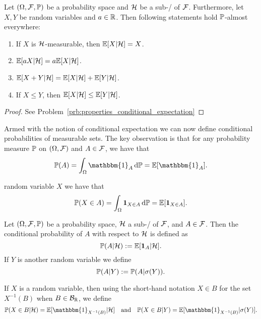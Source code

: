 \begin{lemma}\label{lem:properties_conditional_expectation}
Let $(\Omega, \mathcal F, \mathbb P)$ be a probability space and $\mathcal H$ be a sub-\sigalg/ of $\mathcal F$. Furthermore, let $X, Y$ be random variables and $a \in \mathbb R$. Then following statements hold $\mathbb P$-almost everywhere:
\begin{enumerate}[label={(\alph*)}]
\item If $X$ is $\mathcal H$-measurable, then $\mathbb E[X | \mathcal H] = X$.
\item $\mathbb E[a X | \mathcal H] = a \mathbb E[X | \mathcal H]$.
\item $\mathbb E[X + Y | \mathcal H] = \mathbb E[X | \mathcal H] + \mathbb E[Y | \mathcal H]$.
\item If $X \le Y$, then $\mathbb E[X | \mathcal H] \le \mathbb E[Y | \mathcal H]$.
\end{enumerate}
\end{lemma}

\begin{proof}
See Problem~\ref{prb:properties_conditional_expectation}
\end{proof}


Armed with the notion of conditional expectation we can now define conditional probabilities of measurable sets. The key observation is that for any probability measure $\mathbb P$ on $(\Omega, \mathcal F)$ and $A \in \mathcal F$, we have that
\[
	\bbP(A) = \int_\Omega \mathbbm{1}_{A} \, \dd \bbP = \bbE[\mathbbm{1}_A].
\]

random variable $X$ we have that
\[
	\mathbb P(X \in A) = \int_\Omega \mathbf{1}_{X \in A} \, \mathrm{d} \mathbb P = \mathbb E[\mathbf{1}_{X \in A}].
\]

\begin{definition}
Let $(\Omega, \mathcal F, \mathbb P)$ be a probability space, $\mathcal H$ a sub-\sigalg/ of $\mathcal F$, and $A \in \mathcal F$. Then the conditional probability of $A$ with respect to $\mathcal H$ is defined as
\[
	\mathbb P(A | \mathcal H) := \mathbb E[\mathbf{1}_{A} | \mathcal H].
\]
If $Y$ is another random variable we define
\[
	\mathbb P(A | Y) := \mathbb P( A | \sigma(Y)).
\]
\end{definition}

If $X$ is a random variable, then using the short-hand notation $X \in B$ for the set $X^{-1}(B)$ when $B \in \mathcal B_{\mathbb R}$, we define
\begin{equation}
	\bbP(X \in B | \cH) = \bbE[\mathbbm{1}_{X^{-1}(B)} | \cH] \quad \text{and} \quad
	\bbP(X \in B | Y) = \bbE[\mathbbm{1}_{X^{-1}(B)} | \sigma(Y)].
\end{equation}

